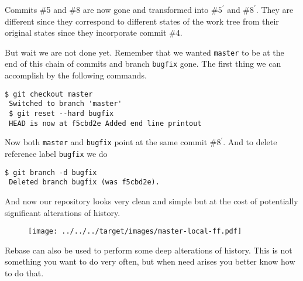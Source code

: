 \documentclass{article}
\theoremstyle{definition}
\begin{document}
        \noindent Commits \#5 and \#8 are now gone and transformed into \#$5^{'}$ and \#$8^{'}$. They are different
        since they correspond to different states of the work tree from their original states since they incorporate
        commit \#4.

        But wait we are not done yet. Remember that we wanted \texttt{master} to be at the end of this chain of commits
        and branch \texttt{bugfix} gone. The first thing we can accomplish by the following commands.
        \begin{Verbatim}[frame=single]
 $ git checkout master
 Switched to branch 'master'
 $ git reset --hard bugfix
 HEAD is now at f5cbd2e Added end line printout
        \end{Verbatim}
        Now both \texttt{master} and \texttt{bugfix} point at the same commit \#$8^{'}$. And to delete reference
        label \texttt{bugfix} we do
        \begin{Verbatim}[frame=single]
 $ git branch -d bugfix
 Deleted branch bugfix (was f5cbd2e).
        \end{Verbatim}
        And now our repository looks very clean and simple but at the cost of potentially significant alterations of
        history.

        \begin{figure}[h]
        \centering\texttt{[image: ../../../target/images/master-local-ff.pdf]}
        \caption{\label{fig:master-local-ff}}
        \end{figure}

        \noindent Rebase can also be used to perform some deep alterations of history. This is not something you want to
        do very often, but when need arises you better know how to do that.
\end{document}
